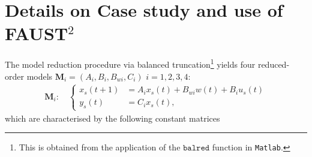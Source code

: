 \documentclass[letterpaper, 10 pt, conference]{amsart}
\theoremstyle{definition}
\theoremstyle{example}
\theoremstyle{remark}
\begin{document}
\section{Details on Case study and use of FAUST$^2$}The model reduction procedure via balanced truncation\footnote{This is obtained from the application of the $\texttt{balred}$ function in \texttt{Matlab}.} 
yields four reduced-order models $\mathbf M_{i}=(A_{i},B_{i},B_{wi},C_{i})$ $i=1,2,3,4$: 
 \begin{align*}
 \mathbf M_{i} :\quad\left\{\begin{array}{ll}
x_{s}(t+1)&=A_{i} x_{s}(t)+ B_{wi}w(t)+B_{i} u_{s}(t)\\
y_{s}(t)&= C_{i} x_{s}(t),\end{array}\right.
\end{align*}
which are characterised by the following constant matrices 
\end{document}
